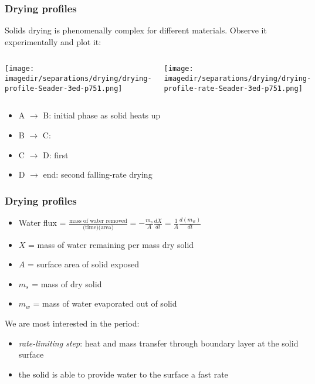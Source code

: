 \begin{frame}\frametitle{Drying profiles}
	Solids drying is phenomenally complex for different materials. Observe it experimentally and plot it:

	\hfill{}
	\vspace{-12pt}
	\begin{columns}[b]
			\begin{center}
				\texttt{[image: \\imagedir/separations/drying/drying-profile-Seader-3ed-p751.png]}
			\end{center}
			\begin{center}
				\texttt{[image: \\imagedir/separations/drying/drying-profile-rate-Seader-3ed-p751.png]}
			\end{center}
			\vspace{-7pt}
	\end{columns}

	\begin{itemize}
		\item	A $\rightarrow$ B: initial phase as solid heats up
		\item	B $\rightarrow$ C: {\color{purple}{constant-rate drying}}
		\item	C $\rightarrow$ D: first {\color{purple}{falling-rate drying}}
		\item	D $\rightarrow$ end: second falling-rate drying
	\end{itemize}
\end{frame}

\begin{frame}\frametitle{Drying profiles}
	\begin{itemize}
		\item	Water flux = $\displaystyle \frac{\text{mass of water removed}}{\text{(time)(area)}} = - \displaystyle \frac{m_s}{A} \frac{dX}{dt} = \frac{1}{A} \frac{d(m_w)}{dt}$
		\item	$X$ = mass of water remaining per mass dry solid
		\item	$A$ = surface area of solid exposed
		\item	$m_s$ = mass of dry solid
		\item	$m_w$ = mass of water evaporated out of solid
	\end{itemize}
	\vspace{12pt}
	We are most interested in the {\color{purple}{constant drying-rate}} period:
	\begin{itemize}
		\item	\emph{rate-limiting step}: heat and mass transfer through boundary layer at the solid surface
		\item	the solid is able to provide water to the surface a fast rate
	\end{itemize}
\end{frame}

